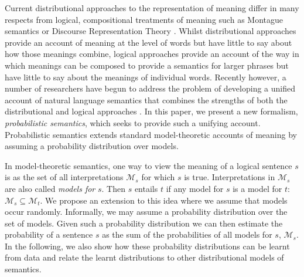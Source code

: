 \documentclass[letterpaper]{article}
\begin{document}
Current distributional approaches to the representation of meaning differ in many respects from logical, compositional treatments of meaning
such as Montague semantics or
Discourse Representation Theory \cite{Blackburn:05}. Whilst distributional approaches provide an account of meaning at the level of words but have little to say about how those meanings combine, logical approaches provide an account of the way in which meanings can be composed to provide a semantics for larger phrases but have little to say about the meanings of individual words.  Recently however, a number of researchers have begun to address the problem of  developing a unified account of natural language semantics that combines the strengths of both the distributional and logical approaches
\cite{Clarke:07,Coecke:10,Garrette:11,Lewis:13}.  In this paper, we present a new formalism, {\em probabilistic semantics\/}, which seeks to provide such a unifying
account. Probabilistic semantics extends standard model-theoretic
accounts of meaning by assuming a probability distribution over
models.  

In model-theoretic semantics, one way to view the meaning
of a logical sentence $s$ is as the set of all interpretations
$\mathcal{M}_s$ for which $s$ is true. Interpretations in $\mathcal{M}_s$ are also called {\em models for\/}
$s$. Then $s$ entails $t$ if any model for $s$ is a model for $t$: $\mathcal{M}_s \subseteq
\mathcal{M}_t$. We propose an extension to this idea where we assume
that models occur randomly. Informally, we may assume a probability
distribution over the set of models. Given such a probability distribution we can then estimate the
probability of a sentence $s$ as the sum of the probabilities of all
models for $s$, $\mathcal{M}_s$. In the following, we also show how these probability
distributions can be learnt from data and relate the learnt
distributions to other distributional models of semantics.
\end{document}
